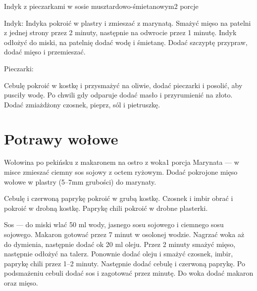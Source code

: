 \documentclass[a4paper,12pt]{article}
\begin{document}
\begin{recipe}{Indyk z pieczarkami w sosie musztardowo-śmietanowym}{2 porcje}{}

\freeform%
Indyk:
Indyka pokroić w plastry i zmieszać z marynatą. 
Smażyć mięso na patelni z jednej strony przez 2 minuty, następnie na odwrocie
przez 1 minutę. Indyk odłożyć do miski, na patelnię dodać wodę i śmietanę.
Dodać szczyptę przypraw, dodać mięso i przemieszać. 

\freeform%
Pieczarki:


Cebulę pokroić w kostkę i przysmażyć na oliwie, dodać pieczarki i posolić, aby
pusciły wodę. Po chwili gdy odparuje dodać masło i przyrumienić na złoto. Dodać
zmiażdżony czosnek, pieprz, sól i pietruszkę.

\end{recipe}

\newpage

\section{Potrawy wołowe}

\begin{recipe}{Wołowina po pekińsku z makaronem na ostro z woka}{1 porcja}{}
Marynata --- w misce zmieszać ciemny sos sojowy z octem ryżowym. Dodać
pokrojone mięso wołowe w plastry (5--7mm grubości) do marynaty.

Cebulę i czerwoną paprykę pokroić w grubą kostkę. Czosnek i imbir obrać i
pokroić w drobną kostkę. Paprykę chili pokroić w drobne plasterki.

Sos --- do miski wlać 50 ml wody, jasnego sosu sojowego i ciemnego sosu sojowego. 
Makaron gotować przez 7 minut w osolonej wodzie.
\freeform%
Nagrzać woka aż do dymienia, następnie dodać ok 20 ml oleju. Przez 2 minuty
smażyć mięso, następnie odłożyć na talerz. Ponownie dodać oleju i smażyć
czosnek, imbir, paprykę chili przez 1--2 minuty. Następnie dodać cebulę i
czerwoną paprykę. Po podsmażeniu cebuli dodać sos i zagotować przez minutę. Do
woka dodać makaron oraz mięso.

\end{recipe}
\end{document}
